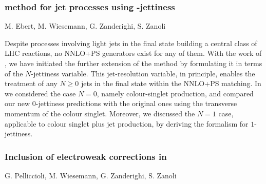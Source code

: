 \documentclass{FBR_Bericht_2025}
\begin{document}
\begin{refsection}
\subsubsection[\minnlo{} method for jet processes using $N$-jettiness]{\minnlo{} method for jet processes using -jettiness}
\begin{Namen}
M. Ebert, M. Wiesemann, G. Zanderighi, S. Zanoli
\end{Namen}
Despite processes involving light jets in the final state building a 
central class of LHC reactions, no NNLO+PS generators exist for any of them.
With the work of , we have initiated the further extension of the \minnlo{} method by
formulating it in terms of the $N$-jettiness variable. This jet-resolution variable,
in principle, enables the treatment of any $N\ge 0$ jets in the final state within the 
NNLO+PS matching. In  we considered the case $N=0$, namely colour-singlet
production, and compared our new $0$-jettiness predictions with the original \minnlo{}
ones using the transverse momentum of the colour singlet.
Moreover, we discussed the $N=1$ case, applicable to colour singlet
plus jet production, by deriving the \minnlo{} formalism for $1$-jettiness.
%
\subsubsection{Inclusion of electroweak corrections in \minnlo{}}
\begin{Namen}
G. Pelliccioli, M. Wiesemann, G. Zanderighi, S. Zanoli
\end{Namen}


\end{refsection}
\end{document}
